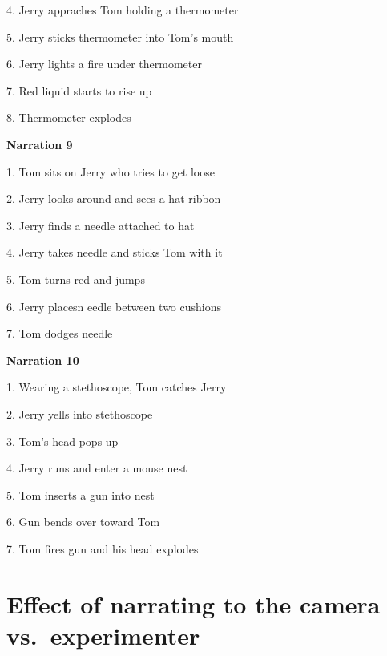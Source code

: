 \documentclass[]{elsarticle} %
\begin{document}
4. Jerry appraches Tom holding a thermometer

5. Jerry sticks thermometer into Tom's mouth

6. Jerry lights a fire under thermometer

7. Red liquid starts to rise up

8. Thermometer explodes

\textbf{Narration 9}

1. Tom sits on Jerry who tries to get loose

2. Jerry looks around and sees a hat ribbon

3. Jerry finds a needle attached to hat

4. Jerry takes needle and sticks Tom with it

5. Tom turns red and jumps

6. Jerry placesn eedle between two cushions

7. Tom dodges needle

\textbf{Narration 10}

1. Wearing a stethoscope, Tom catches Jerry

2. Jerry yells into stethoscope

3. Tom's head pops up

4. Jerry runs and enter a mouse nest

5. Tom inserts a gun into nest

6. Gun bends over toward Tom

7. Tom fires gun and his head explodes

\clearpage

\onecolumn

\hypertarget{effect-of-narrating-to-the-camera-vs.-experimenter}{%
\section{Effect of narrating to the camera
vs.~experimenter}\label{effect-of-narrating-to-the-camera-vs.-experimenter}}

\label{section:c}
\end{document}
